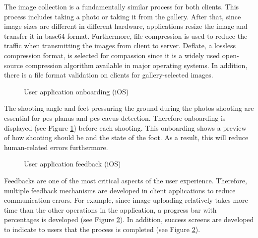 The image collection is a fundamentally similar process for both clients. This process includes taking a photo or taking it from the gallery. After that, since image sizes are different in different hardware, applications resize the image and transfer it in base64 format. Furthermore, file compression is used to reduce the traffic when transmitting the images from client to server. Deflate, a lossless compression format, is selected for compassion since it is a widely used open-source compression algorithm available in major operating systems. In addition, there is a file format validation on clients for gallery-selected images. 

\begin{figure}[htbp]
\centering
{}
\caption{User application onboarding (iOS)}
\label{fig:UserApplicationOnboarding}
\end{figure}

The shooting angle and feet pressuring the ground during the photos shooting are essential for pes planus and pes cavus detection. Therefore onboarding is displayed (see Figure \ref{fig:UserApplicationOnboarding}) before each shooting. This onboarding shows a preview of how shooting should be and the state of the foot. As a result, this will reduce human-related errors furthermore. 

\begin{figure}[htbp]
\centering
{}
\caption{User application feedback (iOS)}
\label{fig:UserApplicationFeedback}
\end{figure}

Feedbacks are one of the most critical aspects of the user experience.  Therefore, multiple feedback mechanisms are developed in client applications to reduce communication errors. For example, since image uploading relatively takes more time than the other operations in the application, a progress bar with percentages is developed (see Figure \ref{fig:UserApplicationFeedback}). In addition, success screens are developed to indicate to users that the process is completed (see Figure \ref{fig:UserApplicationFeedback}).  

